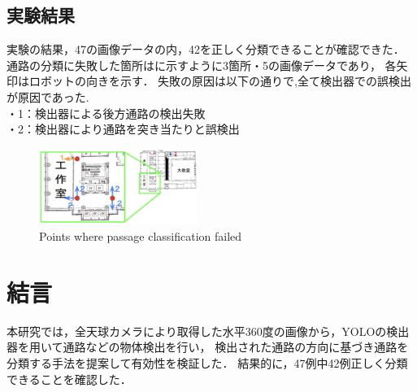 \documentclass[10pt]{jarticle}
\begin{document}
    
     \subsection{実験結果}%
     実験の結果，47の画像データの内，42を正しく分類できることが確認できた．
     通路の分類に失敗した箇所はに示すように3箇所・5の画像データであり，
     各矢印はロボットの向きを示す．
     失敗の原因は以下の通りで,全て検出器での誤検出が原因であった.\\
     ・1：検出器による後方通路の検出失敗\\
     ・2：検出器により通路を突き当たりと誤検出
     \begin{figure}[!b]
         \includegraphics[width=0.46\textwidth]{./fig/experiment_result.png}
         \caption{Points where passage classification failed}
         \label{fig:miss_classification}
     \end{figure}
    
    \section{結\hspace{2zw}言}%
    本研究では，全天球カメラにより取得した水平360度の画像から，YOLOの検出器を用いて通路などの物体検出を行い，
    検出された通路の方向に基づき通路を分類する手法を提案して有効性を検証した．
    結果的に，47例中42例正しく分類できることを確認した．

    
    
\end{document}
